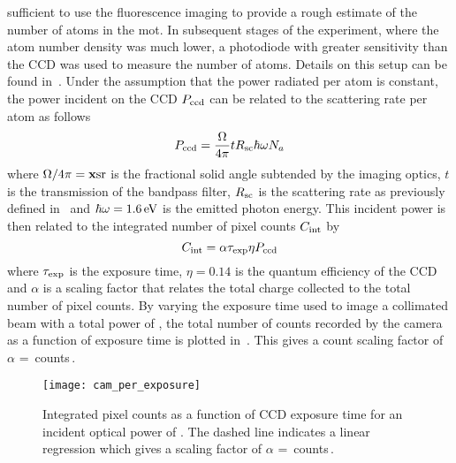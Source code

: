 sufficient to use the fluorescence imaging to provide a rough estimate of the
number of atoms in the \ac{mot}. In subsequent stages of the experiment, where
the atom number density was much lower, a photodiode with greater sensitivity
than the CCD was used to measure the number of atoms. Details on this setup can
be found in~. Under the assumption that the
power radiated per atom is constant, the power incident on the CCD
\(P_\textnormal{ccd}\) can be related to the scattering rate per atom as follows
\begin{equation}
	P_\textnormal{ccd} = \frac{\Omega}{4\pi} t R_\textnormal{sc}  \hbar \omega N_a
\end{equation}
where $\Omega/4\pi = \textbf{x}\sivalue{}{\steradian}$ is the fractional
solid angle subtended by the imaging optics, \(t\) is the transmission of the bandpass filter, \(R_\textnormal{sc}\) is the
scattering rate as previously defined in~ and
\(\hbar \omega = \sivalue{1.6}{\electronvolt}\) is the emitted photon energy.
This incident power is then related to the integrated number of pixel counts
\(C_\textnormal{int}\) by
\begin{equation}
	C_\textnormal{int} = \alpha \tau_\textnormal{exp} \eta P_\textnormal{ccd}
\end{equation}
where \(\tau_\textnormal{exp}\) is the exposure time, \(\eta = 0.14\) is the
quantum efficiency of the CCD and \(\alpha\) is a scaling factor that relates
the total charge collected to the total number of pixel counts. By varying
the exposure time used to image a collimated beam with a total power of
, the total number of counts recorded by the
camera as a function of exposure time is plotted
in~. This gives a count scaling factor of
\(\alpha\) =
\,counts\,\sivalue{}{\per\micro\second\per\micro\watt}.  
\begin{figure}
	\centering
	\texttt{[image: cam\_per\_exposure]}
	\caption[Integrated pixel counts as a function of CCD exposure time.]{Integrated pixel counts as a function of CCD exposure time for an incident
		optical power of . The dashed line indicates a
		linear regression which gives a scaling factor of \(\alpha\) =
		\,counts\,\sivalue{}{\per\micro\second\per\micro\watt}.}
	\label{fig:camera_counts}
\end{figure}


